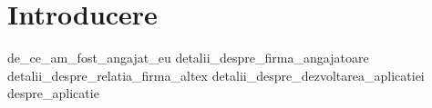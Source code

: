 \chapter{Introducere}
{de_ce_am_fost_angajat_eu}
{detalii_despre_firma_angajatoare}
{detalii_despre_relatia_firma_altex}
{detalii_despre_dezvoltarea_aplicatiei}
{despre_aplicatie}